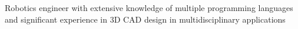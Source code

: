 Robotics engineer with extensive knowledge of multiple programming languages and significant experience in 3D CAD design in multidisciplinary applications

